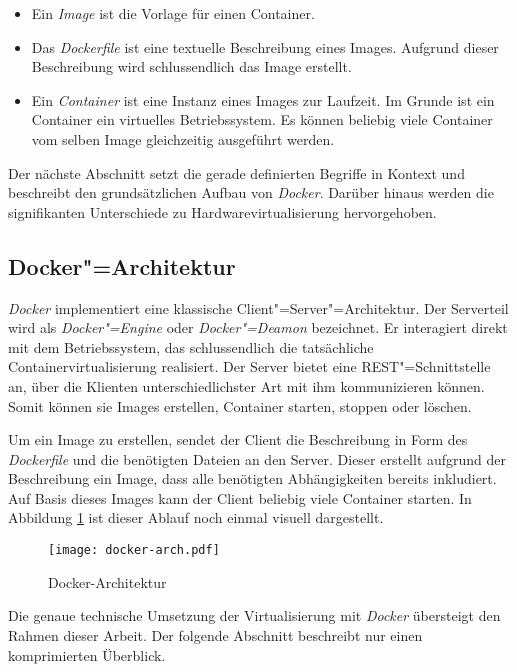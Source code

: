 \begin{itemize}
	\item Ein \textit{Image} ist die Vorlage für einen Container.
	\item Das \textit{Dockerfile} ist eine textuelle Beschreibung eines Images. Aufgrund dieser Beschreibung wird schlussendlich das Image erstellt.
	\item Ein \textit{Container} ist eine Instanz eines Images zur Laufzeit. Im Grunde ist ein Container ein virtuelles Betriebssystem. Es können beliebig viele Container vom selben Image gleichzeitig ausgeführt werden.
\end{itemize}

Der nächste Abschnitt setzt die gerade definierten Begriffe in Kontext und beschreibt den grundsätzlichen Aufbau von \textit{Docker}. Darüber hinaus werden die signifikanten Unterschiede zu Hardwarevirtualisierung hervorgehoben.

\subsection{Docker"=Architektur}

\textit{Docker} implementiert eine klassische Client"=Server"=Architektur. Der Serverteil wird als \textit{Docker"=Engine} oder \textit{Docker"=Deamon} bezeichnet. Er interagiert direkt mit dem Betriebssystem, das schlussendlich die tatsächliche Containervirtualisierung realisiert. Der Server bietet eine REST"=Schnittstelle an, über die Klienten unterschiedlichster Art mit ihm kommunizieren können. Somit können sie \zB Images erstellen, Container starten, stoppen oder löschen.

Um ein Image zu erstellen, sendet der Client die Beschreibung in Form des \textit{Dockerfile} und die benötigten Dateien an den Server. Dieser erstellt aufgrund der Beschreibung ein Image, dass alle benötigten Abhängigkeiten bereits inkludiert. Auf Basis dieses Images kann der Client beliebig viele Container starten. In Abbildung \ref{fig:docker-arch} ist dieser Ablauf noch einmal visuell dargestellt.

\begin{figure}[!hbt]%
\centering
\texttt{[image: docker-arch.pdf]}%
\caption{Docker-Architektur}%
\label{fig:docker-arch}%
\end{figure}

Die genaue technische Umsetzung der Virtualisierung mit \textit{Docker} übersteigt den Rahmen dieser Arbeit. Der folgende Abschnitt beschreibt nur einen komprimierten Überblick.

